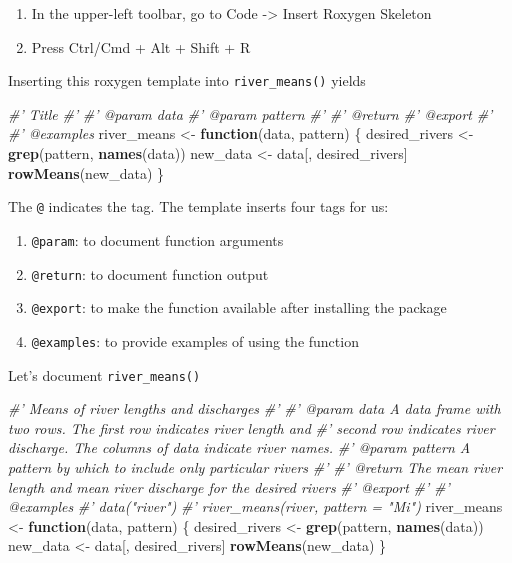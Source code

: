 \documentclass[
]{book}
\newenvironment{Shaded}{\begin{snugshade}}{\end{snugshade}}
\newcommand{\CommentTok}[1]{\textcolor[rgb]{0.56,0.35,0.01}{\textit{#1}}}
\newcommand{\ControlFlowTok}[1]{\textcolor[rgb]{0.13,0.29,0.53}{\textbf{#1}}}
\newcommand{\KeywordTok}[1]{\textcolor[rgb]{0.13,0.29,0.53}{\textbf{#1}}}
\newcommand{\NormalTok}[1]{#1}
\newcommand{\StringTok}[1]{\textcolor[rgb]{0.31,0.60,0.02}{#1}}
\providecommand{\tightlist}{%
  \setlength{\itemsep}{0pt}\setlength{\parskip}{0pt}}
\begin{document}
\begin{enumerate}
\def\labelenumi{\arabic{enumi}.}
\tightlist
\item
  In the upper-left toolbar, go to Code -\textgreater{} Insert Roxygen Skeleton
\item
  Press Ctrl/Cmd + Alt + Shift + R
\end{enumerate}

Inserting this roxygen template into \texttt{river\_means()} yields

\begin{Shaded}
\begin{Highlighting}[]
\CommentTok{#' Title}
\CommentTok{#'}
\CommentTok{#' @param data }
\CommentTok{#' @param pattern }
\CommentTok{#'}
\CommentTok{#' @return}
\CommentTok{#' @export}
\CommentTok{#'}
\CommentTok{#' @examples}
\NormalTok{river_means <-}\StringTok{ }\ControlFlowTok{function}\NormalTok{(data, pattern) \{}
\NormalTok{  desired_rivers <-}\StringTok{ }\KeywordTok{grep}\NormalTok{(pattern, }\KeywordTok{names}\NormalTok{(data))}
\NormalTok{  new_data <-}\StringTok{ }\NormalTok{data[, desired_rivers]}
  \KeywordTok{rowMeans}\NormalTok{(new_data)}
\NormalTok{\}}
\end{Highlighting}
\end{Shaded}

The \texttt{@} indicates the tag. The template inserts four tags for us:

\begin{enumerate}
\def\labelenumi{\arabic{enumi}.}
\tightlist
\item
  \texttt{@param}: to document function arguments
\item
  \texttt{@return}: to document function output
\item
  \texttt{@export}: to make the function available after installing the package
\item
  \texttt{@examples}: to provide examples of using the function
\end{enumerate}

Let's document \texttt{river\_means()}

\begin{Shaded}
\begin{Highlighting}[]
\CommentTok{#' Means of river lengths and discharges}
\CommentTok{#'}
\CommentTok{#' @param data A data frame with two rows. The first row indicates river length and}
\CommentTok{#'   second row indicates river discharge. The columns of data indicate river names.}
\CommentTok{#' @param pattern A pattern by which to include only particular rivers}
\CommentTok{#'}
\CommentTok{#' @return The mean river length and mean river discharge for the desired rivers}
\CommentTok{#' @export}
\CommentTok{#'}
\CommentTok{#' @examples}
\CommentTok{#' data("river")}
\CommentTok{#' river_means(river, pattern = "Mi")}
\NormalTok{river_means <-}\StringTok{ }\ControlFlowTok{function}\NormalTok{(data, pattern) \{}
\NormalTok{  desired_rivers <-}\StringTok{ }\KeywordTok{grep}\NormalTok{(pattern, }\KeywordTok{names}\NormalTok{(data))}
\NormalTok{  new_data <-}\StringTok{ }\NormalTok{data[, desired_rivers]}
  \KeywordTok{rowMeans}\NormalTok{(new_data)}
\NormalTok{\}}
\end{Highlighting}
\end{Shaded}
\end{document}
